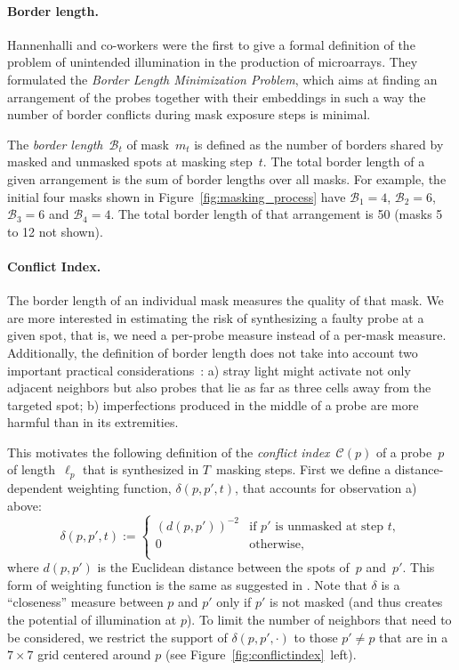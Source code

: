\documentclass[english]{lni}
\begin{document}
\paragraph{Border length.}
Hannenhalli and co-workers \cite{HANNENHALLI02} were the first to give a formal
definition of the problem
of unintended illumination in the production of microarrays. They formulated the
\emph{Border Length Minimization Problem}, which aims at finding an arrangement
of the probes together with their embeddings in such a way the number of border
conflicts during mask exposure steps is minimal.

The \emph{border length}~$\mathcal{B}_t$ of mask~$m_{t}$ is defined as
the number of borders shared by masked and unmasked spots at masking
step~$t$. The total border length of a given arrangement is the sum of
border lengths over all masks. For example, the initial four masks
shown in Figure~\ref{fig:masking_process} have $\mathcal{B}_1 = 4$,
$\mathcal{B}_2 = 6$, $\mathcal{B}_3 = 6$ and $\mathcal{B}_4 = 4$. The
total border length of that arrangement is 50 (masks 5 to 12 not
shown).

\paragraph{Conflict Index.}
The border length of an individual mask measures the quality of that
mask. We are more interested in estimating the risk of synthesizing a faulty
probe at a given spot, that is, we need a per-probe measure
instead of a per-mask measure. Additionally,
the definition of border length does not take into account two
important practical considerations~\cite{KAHNG03A}:
a) stray light might activate not only adjacent neighbors but
also probes that lie as far as three cells away from the targeted
spot;
b) imperfections produced in the middle of a probe are more
harmful than in its extremities.

This motivates the following definition of the \emph{conflict
  index}~$\mathcal{C}(p)$ of a probe~$p$ of length~$\ell_{p}$ that is
synthesized in $T$~masking steps. First we define a distance-dependent
weighting function, $\delta(p,p',t)$, that accounts for observation a)
above:
\begin{equation}
\label{eq:dist_weight}
\delta(p,p',t) :=
\left\{
        \begin{array}{ll}
                (d(p,p'))^{-2} & \mbox{if $p'$ is unmasked at step $t$}, \\
                0 & \mbox{otherwise}, \\
        \end{array}
\right.
\end{equation}
where $d(p,p')$ is the Euclidean distance between the spots of~$p$ and~$p'$.
This form of weighting function is the same as suggested in
\cite{KAHNG03A}.  Note that $\delta$ is a ``closeness'' measure
between $p$ and $p'$ only if $p'$ is
not masked (and thus creates the potential of illumination at $p$). To
limit the number of neighbors that need to be considered, we
restrict the support of $\delta(p,p',\cdot)$ to those $p'\neq p$ that
are in a $7\times 7$ grid centered around $p$ (see
Figure~\ref{fig:conflictindex}~left).
\end{document}
